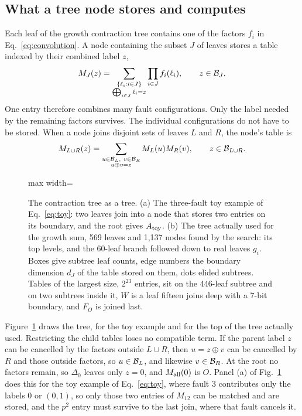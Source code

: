 \subsection{What a tree node stores and computes}\label{app:E-tree}
Each leaf of the growth contraction tree contains one of the factors $f_i$ in Eq.~\eqref{eq:convolution}. A node containing the subset $J$ of leaves stores a table indexed by their combined label $z$,
\begin{equation}
 M_J(z)=\sum_{\substack{\{\ell_i:i\in J\}\\
                      \bigoplus_{i\in J}\ell_i=z}}
                  \prod_{i\in J}f_i(\ell_i),
 \qquad z\in{\cal B}_J.
 \label{eq:treemessage}
\end{equation}
One entry therefore combines many fault configurations. Only the label needed by the remaining factors survives. The individual configurations do not have to be stored.
When a node joins disjoint sets of leaves $L$ and $R$, the node's table is
\begin{equation}
 \begin{gathered}
 M_{L\cup R}(z)=
 \sum_{\substack{u\in{\cal B}_L,\ v\in{\cal B}_R\\u\oplus v=z}}
            M_L(u)M_R(v),\qquad z\in{\cal B}_{L\cup R}.
 \end{gathered}
 \label{eq:treeconvolution}
\end{equation}
{\color{black}
\begin{figure}[H]\centering
\begin{adjustbox}{max width=\linewidth}\end{adjustbox}
\caption{The contraction tree as a tree. (a) The three-fault toy example of Eq.~\eqref{eq:toy}: two leaves join into a node that stores two entries on its boundary, and the root gives $A_{\rm toy}$. (b) The tree actually used for the growth sum, 569 leaves and 1,137 nodes found by the search: its top levels, and the 60-leaf branch followed down to real leaves $g_i$. Boxes give subtree leaf counts, edge numbers the boundary dimension $d_J$ of the table stored on them, dots elided subtrees. Tables of the largest size, $2^{23}$ entries, sit on the 446-leaf subtree and on two subtrees inside it, $W$ is a leaf fifteen joins deep with a 7-bit boundary, and $F_O$ is joined last.}
\label{fig:treenodes}
\end{figure}}
Figure~\ref{fig:treenodes} draws the tree, for the toy example and for the top of the tree actually used.
Restricting the child tables loses no compatible term. If the parent label $z$ can be cancelled by the factors outside $L\cup R$, then $u=z\oplus v$ can be cancelled by $R$ and those outside factors, so $u\in{\cal B}_L$, and likewise $v\in{\cal B}_R$. At the root no factors remain, so $\Delta_0$ leaves only $z=0$, and $M_{\rm all}(0)$ is $O$. Panel (a) of Fig.~\ref{fig:treenodes} does this for the toy example of Eq.~\eqref{eq:toy}, where fault 3 contributes only the labels $0$ or $(0,1)$, so only those two entries of $M_{12}$ can be matched and are stored, and the $p^2$ entry must survive to the last join, where that fault cancels it.

